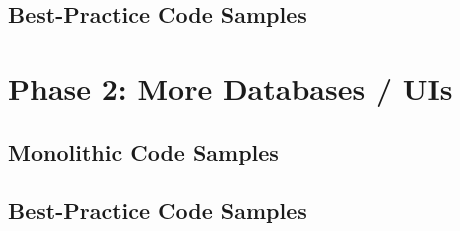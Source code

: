 \subsection{Best-Practice Code Samples}

\section{Phase 2: More Databases / UIs}

\subsection{Monolithic Code Samples}

\subsection{Best-Practice Code Samples}

